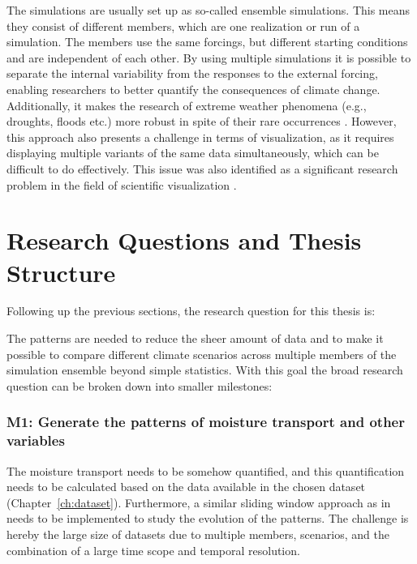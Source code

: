 The simulations are usually set up as so-called ensemble simulations. 
This means they consist of different members, which are one realization or run of a simulation. 
The members use the same forcings, but different starting conditions and are independent of each other. 
By using multiple simulations it is possible to separate the internal variability from the responses to the external forcing, enabling researchers to better quantify the consequences of climate change. 
Additionally, it makes the research of extreme weather phenomena (e.g., droughts, floods etc.) more robust in spite of their rare occurrences \cite{maher_large_2021}.
However, this approach also presents a challenge in terms of visualization, as it requires displaying multiple variants of the same data simultaneously, which can be difficult to do effectively.
This issue was also identified as a significant research problem in the field of scientific visualization \cite{johnson_top_2004}. 


\section{Research Questions and Thesis Structure}
\label{sec:research_questions}

Following up the previous sections, the research question for this thesis is: 

\begin{center}
\end{center}

The patterns are needed to reduce the sheer amount of data and to make it possible to compare different climate scenarios across multiple members of the simulation ensemble beyond simple statistics.
With this goal the broad research question can be broken down into smaller milestones: 

\subsubsection{M1: Generate the patterns of moisture transport and other variables}

The moisture transport needs to be somehow quantified, and this quantification needs to be calculated based on the data available in the chosen dataset (Chapter~\ref{ch:dataset}). 
Furthermore, a similar sliding window approach as in \cite{vietinghoff_visual_2021} needs to be implemented to study the evolution of the patterns.
The challenge is hereby the large size of datasets due to multiple members, scenarios, and the combination of a large time scope and temporal resolution. 

